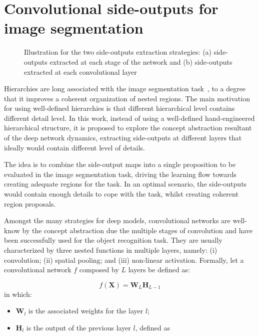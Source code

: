 \section{Convolutional side-outputs for image segmentation}
\label{sec:method}

\begin{figure}[!t]
\centering
{}
\hfil
{}
\caption{Illustration for the two side-outputs extraction strategies:  (a) side-outputs extracted at each stage of the network and (b) side-outputs extracted at each convolutional layer}
\label{fig:extraction}
\end{figure}

Hierarchies are long associated with the image segmentation task~\cite{jones97,cardelino06,najman12,xu16,cousty18}, to a degree that it improves a coherent organization of nested regions. The main motivation for using well-defined hierarchies is that different hierarchical level contains different detail level. In this work, instead of using a well-defined hand-engineered hierarchical structure, it is proposed to explore the concept abstraction resultant of the deep network dynamics, extracting side-outputs at different layers that ideally would contain different level of details. 


The idea is to combine the side-output maps into a single proposition to be evaluated in the image segmentation task, driving the learning flow towards creating adequate regions for the task. In an optimal scenario, the side-outputs would contain enough details to cope with the task, whilst creating coherent region proposals.

Amongst the many strategies for deep models, convolutional networks are well-know by the concept abstraction due the multiple stages of convolution and have been successfully used for the object recognition task. They are usually characterized by three nested functions in multiple layers, namely: (i) convolution; (ii) spatial pooling; and (iii) non-linear activation. Formally, let a convolutional network $\mathit{f}$ composed by $L$ layers be defined as:

\begin{equation}
\mathit{f}(\mathbf{X})=\mathbf{W}_L\mathbf{H}_{L-1}
\end{equation}
\noindent in which:
\begin{itemize}
\item $\mathbf{W}_l$ is the associated weights for the layer $l$;
\item $\mathbf{H}_l$ is the output of the previous layer $l$, defined as
\end{itemize}

